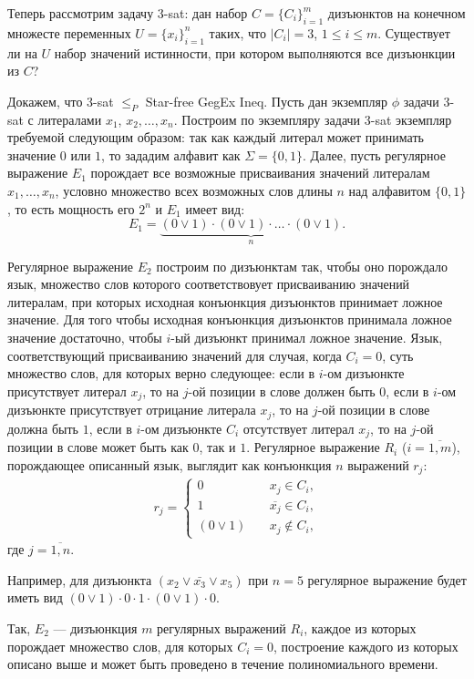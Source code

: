 \documentclass[10pt]{article}
\begin{document}
\medskip\par Теперь рассмотрим задачу $3$-sat: дан набор $C=\{C_i\}_{i=1}^m$ дизъюнктов на конечном множесте переменных $U=\{x_i\}_{i=1}^n$ таких, что $|C_i|=3$, $1\leq i\leq m$. Существует ли на $U$ набор значений истинности, при котором выполняются все дизъюнкции из $C$?
\medskip\par Докажем, что 3-sat $\leq_P$ Star-free GegEx Ineq. Пусть дан экземпляр $\phi$ задачи $3$-sat с литералами $x_1$, $x_2, \dots, x_n$. Построим по экземпляру задачи $3$-sat экземпляр требуемой следующим образом: так как каждый литерал может принимать значение $0$ или $1$, то зададим алфавит как $\Sigma=\{0, 1\}$.
Далее, пусть регулярное выражение $E_1$ порождает все возможные присваивания значений литералам $x_1, \ldots, x_n$, условно множество всех возможных слов длины $n$ над алфавитом $\{0, 1\}$, то есть мощность его $2^n$ и $E_1$ имеет вид: $$E_1=\underbrace{(0 \vee 1)\cdot(0 \vee 1)\cdot\ldots\cdot (0 \vee 1)}_n.$$
\par Регулярное выражение $E_2$ построим по дизъюнктам так, чтобы оно порождало язык, множество слов которого соответствовует присваиванию значений литералам, при которых исходная конъюнкция дизъюнктов принимает ложное значение. Для того чтобы исходная конъюнкция дизъюнктов принимала ложное значение достаточно, чтобы $i$-ый дизъюнкт принимал ложное значение. Язык, соответствующий присваиванию значений для случая, когда $C_i=0$, суть множество слов, для которых верно следующее: если в $i$-ом дизъюнкте присутствует литерал $x_j$, то на $j$-ой позиции в слове должен быть $0$,  если в $i$-ом дизъюнкте присутствует отрицание литерала $x_j$, то на $j$-ой позиции в слове должна быть $1$, если в $i$-ом дизъюнкте $C_i$ отсутствует литерал $x_j$, то на $j$-ой позиции в слове может быть как $0$, так и $1$. Регулярное выражение $R_i$ ($i=\overline{1, m}$), порождающее описанный язык, выглядит как конъюнкция $n$ выражений $r_j$: 
\begin{align*}
r_j=\begin{cases}
0\quad& x_j\in C_i,\\
1 \quad& \overline{x_j}\in C_i,\\
(0\vee 1) \quad& x_j\not\in C_i,
\end{cases}
\end{align*}
где $j=\overline{1,n}$.
\medskip\par
Например, для дизъюнкта $(x_2\vee \bar{x_3} \vee x_5)$ при $n=5$ регулярное выражение будет иметь вид $(0\vee 1)\cdot 0 \cdot 1 \cdot (0\vee 1)\cdot 0$. 
\medskip\par Так, $E_2$ --- дизъюнкция $m$ регулярных выражений $R_i$, каждое из которых порождает множество слов, для которых $C_i=0$, построение каждого из которых описано выше и может быть проведено в течение полиномиального времени.
\end{document}
